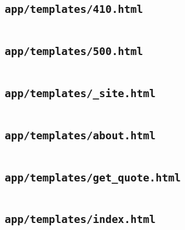 \subsection{\texttt{app/templates/410.html}}
\begin{codelisting}
\label{fcl:uswacs-2-iy2d502-salapp:410.html}
\inputminted[breakanywhere]{html+jinja}{../uswacs-2-iy2d502-salapp/app/templates/410.html}\end{codelisting}
\subsection{\texttt{app/templates/500.html}}
\begin{codelisting}
\label{fcl:uswacs-2-iy2d502-salapp:500.html}
\inputminted[breakanywhere]{html+jinja}{../uswacs-2-iy2d502-salapp/app/templates/500.html}\end{codelisting}
\subsection{\texttt{app/templates/\_site.html}}
\begin{codelisting}
\label{fcl:uswacs-2-iy2d502-salapp:_site.html}
\inputminted[breakanywhere]{html+jinja}{../uswacs-2-iy2d502-salapp/app/templates/_site.html}\end{codelisting}
\subsection{\texttt{app/templates/about.html}}
\begin{codelisting}
\label{fcl:uswacs-2-iy2d502-salapp:about.html}
\inputminted[breakanywhere]{html+jinja}{../uswacs-2-iy2d502-salapp/app/templates/about.html}\end{codelisting}
\subsection{\texttt{app/templates/get\_quote.html}}
\begin{codelisting}
\label{fcl:uswacs-2-iy2d502-salapp:get_quote.html}
\inputminted[breakanywhere]{html+jinja}{../uswacs-2-iy2d502-salapp/app/templates/get_quote.html}\end{codelisting}
\subsection{\texttt{app/templates/index.html}}
\begin{codelisting}
\label{fcl:uswacs-2-iy2d502-salapp:index.html}
\inputminted[breakanywhere]{html+jinja}{../uswacs-2-iy2d502-salapp/app/templates/index.html}\end{codelisting}
